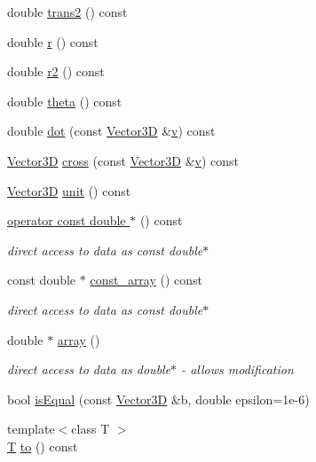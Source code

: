 \begin{DoxyCompactItemize}
\item 
double \hyperlink{class_d_d_surfaces_1_1_vector3_d_a16e16a96c50ef3cbfeca03113d0cf255}{trans2} () const 
\item 
double \hyperlink{class_d_d_surfaces_1_1_vector3_d_a9167cd0ad13311186a093e572d9e5a74}{r} () const 
\item 
double \hyperlink{class_d_d_surfaces_1_1_vector3_d_a56922c6c4226eee3c30e1f02de529294}{r2} () const 
\item 
double \hyperlink{class_d_d_surfaces_1_1_vector3_d_a96c64249c95afb43efdeb1f063741871}{theta} () const 
\item 
double \hyperlink{class_d_d_surfaces_1_1_vector3_d_ab8ecaacfe342b30405674f5c9a333677}{dot} (const \hyperlink{class_d_d_surfaces_1_1_vector3_d}{Vector3D} \&\hyperlink{_multi_view_8cpp_a8320ee13ac034dbf6d624fe8953dd337}{v}) const 
\item 
\hyperlink{class_d_d_surfaces_1_1_vector3_d}{Vector3D} \hyperlink{class_d_d_surfaces_1_1_vector3_d_af5442c28fbaf25088d92faea39ad8fee}{cross} (const \hyperlink{class_d_d_surfaces_1_1_vector3_d}{Vector3D} \&\hyperlink{_multi_view_8cpp_a8320ee13ac034dbf6d624fe8953dd337}{v}) const 
\item 
\hyperlink{class_d_d_surfaces_1_1_vector3_d}{Vector3D} \hyperlink{class_d_d_surfaces_1_1_vector3_d_a549d743110d470a18044d8921d7afa44}{unit} () const 
\item 
\hyperlink{class_d_d_surfaces_1_1_vector3_d_ad0e25d4efbcffb774004313492d79417}{operator const double $\ast$} () const 
\begin{DoxyCompactList}\small\item\em direct access to data as const double$\ast$ \item\end{DoxyCompactList}\item 
const double $\ast$ \hyperlink{class_d_d_surfaces_1_1_vector3_d_a16dc8cedd8420c5f52dbbdc7674593dd}{const\_\-array} () const 
\begin{DoxyCompactList}\small\item\em direct access to data as const double$\ast$ \item\end{DoxyCompactList}\item 
double $\ast$ \hyperlink{class_d_d_surfaces_1_1_vector3_d_a467bf79fd3e74223a070ecc612d54526}{array} ()
\begin{DoxyCompactList}\small\item\em direct access to data as double$\ast$ -\/ allows modification \item\end{DoxyCompactList}\item 
bool \hyperlink{class_d_d_surfaces_1_1_vector3_d_af6ffa436fc2d34bb4485b5a4a18d008e}{isEqual} (const \hyperlink{class_d_d_surfaces_1_1_vector3_d}{Vector3D} \&b, double epsilon=1e-\/6)
\item 
{\footnotesize template$<$class T $>$ }\\\hyperlink{class_t}{T} \hyperlink{class_d_d_surfaces_1_1_vector3_d_a7e3a6c90be186cd87bd0aeb7792ee502}{to} () const 
\end{DoxyCompactItemize}
